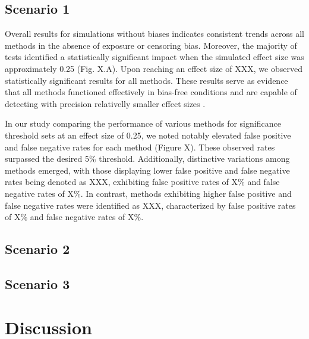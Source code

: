 \documentclass[Afour,sageh,times]{sagej}
\begin{document}
\subsection{Scenario 1}
Overall results for simulations  without biases indicates consistent trends across all methods in the absence of exposure or censoring bias. Moreover, the majority of tests identified a statistically significant impact when the simulated effect size was approximately 0.25 (Fig. X.A).  Upon reaching an effect size of XXX, we observed statistically significant results for all methods. These results serve as evidence that all methods functioned effectively in bias-free conditions and are capable of detecting with precision relativelly smaller effect sizes . 

In our study comparing the performance of various methods for significance threshold sets at an effect size of 0.25, we noted notably elevated false positive and false negative rates for each method (Figure X). These observed rates surpassed the desired 5\% threshold. Additionally, distinctive variations among methods emerged, with those displaying lower false positive and false negative rates being denoted as XXX, exhibiting false positive rates of X\% and false negative rates of X\%. In contrast, methods exhibiting higher false positive and false negative rates were identified as XXX, characterized by false positive rates of X\% and false negative rates of X\%.

\subsection{Scenario 2}

\subsection{Scenario 3}

\section{Discussion}




\end{document}

